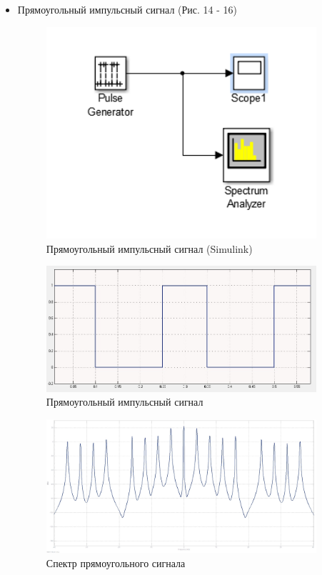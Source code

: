 \documentclass[10pt,a4paper]{article}
\begin{document}
\begin{itemize}
\item Прямоугольный импульсный сигнал (Рис. 14 - 16)
\begin{figure}[h]
\centering
\includegraphics[width=10cm]{3_simulink} 
\caption{Прямоугольный импульсный сигнал (Simulink)} 
\label{fig.l5_4s} 
\end{figure}
\begin{figure}[h]
\centering
\includegraphics[width=10cm]{lab5_3_simulink} 
\caption{Прямоугольный импульсный сигнал} 
\label{fig.l5_5s} 
\end{figure}
\begin{figure}[h]
\centering
\includegraphics[width=10cm]{lab5_4_simulink}
\caption{Спектр прямоугольного сигнала} 
\label{fig.l5_6s} 
\end{figure}


\end{itemize}
\end{document}
